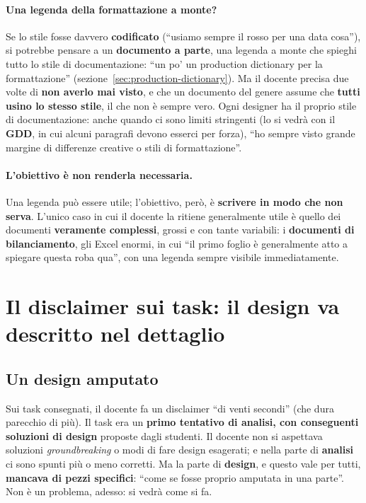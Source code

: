 \paragraph{Una legenda della formattazione a monte?} Se lo stile fosse
davvero \textbf{codificato} (``usiamo sempre il rosso per una data cosa''),
si potrebbe pensare a un \textbf{documento a parte}, una legenda a monte che
spieghi tutto lo stile di documentazione: ``un po' un production dictionary
per la formattazione'' (sezione~\ref{sec:production-dictionary}). Ma il
docente precisa due volte di \textbf{non averlo mai visto}, e che un
documento del genere assume che \textbf{tutti usino lo stesso stile}, il che
non è sempre vero. Ogni designer ha il proprio stile di documentazione: anche
quando ci sono limiti stringenti (lo si vedrà con il \textbf{GDD}, in cui
alcuni paragrafi devono esserci per forza), ``ho sempre visto grande margine
di differenze creative o stili di formattazione''.

\paragraph{L'obiettivo è non renderla necessaria.} Una legenda può essere
utile; l'obiettivo, però, è \textbf{scrivere in modo che non serva}. L'unico
caso in cui il docente la ritiene generalmente utile è quello dei documenti
\textbf{veramente complessi}, grossi e con tante variabili: i
\textbf{documenti di bilanciamento}, gli Excel enormi, in cui ``il primo
foglio è generalmente atto a spiegare questa roba qua'', con una legenda
sempre visibile immediatamente.

\section{Il disclaimer sui task: il design va descritto nel dettaglio}
\label{gd10:sec:dettaglio}

\subsection{Un design amputato}

Sui task consegnati, il docente fa un disclaimer ``di venti secondi'' (che
dura parecchio di più). Il task era un \textbf{primo tentativo di analisi,
con conseguenti soluzioni di design} proposte dagli studenti. Il docente non
si aspettava soluzioni \emph{groundbreaking} o modi di fare design
esagerati; e nella parte di \textbf{analisi} ci sono spunti più o meno
corretti. Ma la parte di \textbf{design}, e questo vale per tutti,
\textbf{mancava di pezzi specifici}: ``come se fosse proprio amputata in una
parte''. Non è un problema, adesso: si vedrà come si fa.

